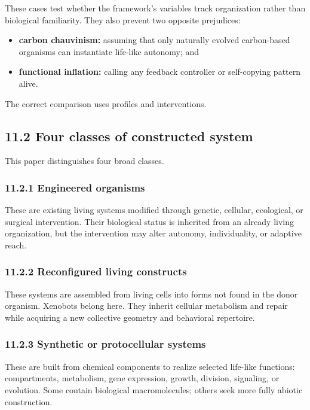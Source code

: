 \documentclass[
  11pt,
]{article}
\providecommand{\tightlist}{%
  \setlength{\itemsep}{0pt}\setlength{\parskip}{0pt}}
\begin{document}
These cases test whether the framework's variables track organization
rather than biological familiarity. They also prevent two opposite
prejudices:

\begin{itemize}
\tightlist
\item
  \textbf{carbon chauvinism:} assuming that only naturally evolved
  carbon-based organisms can instantiate life-like autonomy; and
\item
  \textbf{functional inflation:} calling any feedback controller or
  self-copying pattern alive.
\end{itemize}

The correct comparison uses profiles and interventions.

\subsection{11.2 Four classes of constructed
system}\label{four-classes-of-constructed-system}

This paper distinguishes four broad classes.

\subsubsection{11.2.1 Engineered organisms}\label{engineered-organisms}

These are existing living systems modified through genetic, cellular,
ecological, or surgical intervention. Their biological status is
inherited from an already living organization, but the intervention may
alter autonomy, individuality, or adaptive reach.

\subsubsection{11.2.2 Reconfigured living
constructs}\label{reconfigured-living-constructs}

These systems are assembled from living cells into forms not found in
the donor organism. Xenobots belong here. They inherit cellular
metabolism and repair while acquiring a new collective geometry and
behavioral repertoire.

\subsubsection{11.2.3 Synthetic or protocellular
systems}\label{synthetic-or-protocellular-systems}

These are built from chemical components to realize selected life-like
functions: compartments, metabolism, gene expression, growth, division,
signaling, or evolution. Some contain biological macromolecules; others
seek more fully abiotic construction.
\end{document}
